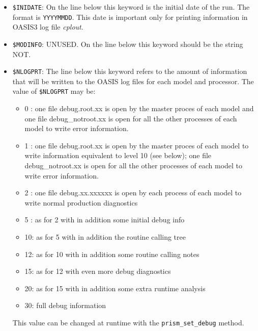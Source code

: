 \begin{itemize}
\item {\tt \$INIDATE}: On the line below this keyword is the initial
  date of the run. The format is {\tt YYYYMMDD}. This date is important only
  for printing information in OASIS3 log file {\it cplout}.

\item {\tt \$MODINFO}: UNUSED.  On the line below this keyword should
be the string NOT.
 
\item {\tt \$NLOGPRT}: The line below this keyword refers to the
  amount of information that will be written to the OASIS log files
  for each model and processor. The value of {\tt \$NLOGPRT} may be:  
  \begin{itemize}
  \item 0 : one file debug.root.xx is open by the master proces of each model and one file debug\_notroot.xx is open for all the other processes of each model to write error information.
  \item 1 : one file debug.root.xx is open by the master proces of each model to write information equivalent to level 10 (see below); one file debug\_notroot.xx is open for all the other processes of each model to write error information.
  \item 2 : one file debug.xx.xxxxxx is open by each process of each model to write normal production diagnostics
  \item 5 : as for 2 with in addition some initial debug info
  \item 10: as for 5 with in addition the routine calling tree
  \item 12: as for 10 with in addition some routine calling notes
  \item 15: as for 12 with even more debug diagnostics
  \item 20: as for 15 with in addition some extra runtime analysis
  \item 30: full debug information
 \end{itemize}
This value can be changed at runtime with the {\tt prism\_set\_debug} method.


\end{itemize}

